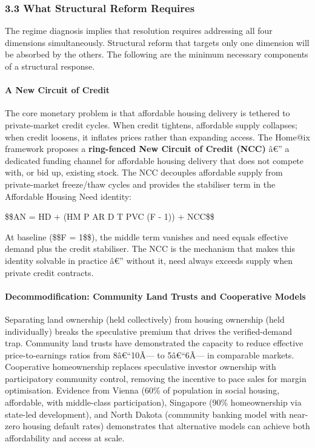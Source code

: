 \subsubsection{3.3 What Structural Reform
Requires}\label{what-structural-reform-requires}

The regime diagnosis implies that resolution requires addressing all
four dimensions simultaneously. Structural reform that targets only one
dimension will be absorbed by the others. The following are the minimum
necessary components of a structural response.

\paragraph{A New Circuit of Credit}\label{a-new-circuit-of-credit}

The core monetary problem is that affordable housing delivery is
tethered to private-market credit cycles. When credit tightens,
affordable supply collapses; when credit loosens, it inflates prices
rather than expanding access. The Home@ix framework proposes a
\textbf{ring-fenced New Circuit of Credit (NCC)} â€'' a dedicated
funding channel for affordable housing delivery that does not compete
with, or bid up, existing stock. The NCC decouples affordable supply
from private-market freeze/thaw cycles and provides the stabiliser term
in the Affordable Housing Need identity:

\$\$AN = HD + (HM \cdot P \cdot AR \cdot D \cdot T \cdot PVC \cdot (F -
1)) + NCC\$\$

At baseline (\$\$F = 1\$\$), the middle term vanishes and need equals
effective demand plus the credit stabiliser. The NCC is the mechanism
that makes this identity solvable in practice â€'' without it, need
always exceeds supply when private credit contracts.

\paragraph{Decommodification: Community Land Trusts and Cooperative
Models}\label{decommodification-community-land-trusts-and-cooperative-models}

Separating land ownership (held collectively) from housing ownership
(held individually) breaks the speculative premium that drives the
verified-demand trap. Community land trusts have demonstrated the
capacity to reduce effective price-to-earnings ratios from 8â€``10Ã---
to 5â€``6Ã--- in comparable markets. Cooperative homeownership replaces
speculative investor ownership with participatory community control,
removing the incentive to pace sales for margin optimisation. Evidence
from Vienna (60\% of population in social housing, affordable, with
middle-class participation), Singapore (90\% homeownership via state-led
development), and North Dakota (community banking model with near-zero
housing default rates) demonstrates that alternative models can achieve
both affordability and access at scale.

